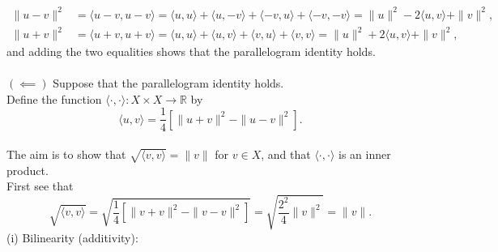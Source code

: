 \begin{enumerate}
    \begin{align*}
        \|u-v\|^2&=\langle u-v,u-v\rangle=\langle u,u\rangle+\langle u,-v\rangle+\langle -v,u\rangle+\langle -v,-v\rangle=\|u\|^2-2\langle u,v\rangle+\|v\|^2,\\
        \|u+v\|^2&=\langle u+v,u+v\rangle=\langle u,u\rangle+\langle u,v\rangle+\langle v,u\rangle+\langle v,v\rangle=\|u\|^2+2\langle u,v\rangle+\|v\|^2,
    \end{align*}
    and adding the two equalities shows that the parallelogram identity holds.\\
    \\$(\impliedby)$ Suppose that the parallelogram identity holds.
    \\Define the function $\langle\cdot,\cdot\rangle:X\times X\to\mathbb{R}$ by
    \[
        \langle u,v \rangle = \frac{1}{4}[\|u+v\|^2-\|u-v\|^2].
    \]
    \\The aim is to show that $\sqrt{\langle v,v\rangle}=\|v\|$ for $v\in X$, and that $\langle\cdot,\cdot\rangle$ is an inner product.
    \\First see that
    \[
        \sqrt{\langle v,v \rangle} = \sqrt{\frac{1}{4}[\|v+v\|^2-\|v-v\|^2]}=\sqrt{\frac{2^2}{4}\|v\|^2}=\|v\|.\tag{1}
    \]
    (i) Bilinearity (additivity):

\end{enumerate}
